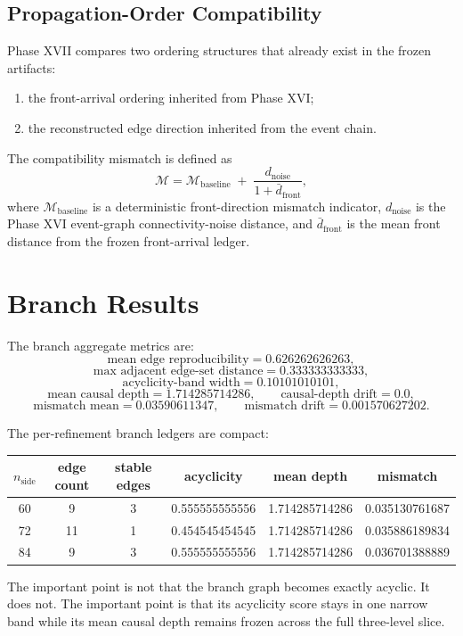 \documentclass[11pt]{article}
\begin{document}
\subsection{Propagation-Order Compatibility}

Phase XVII compares two ordering structures that already exist in the frozen artifacts:
\begin{enumerate}
\item the front-arrival ordering inherited from Phase XVI;
\item the reconstructed edge direction inherited from the event chain.
\end{enumerate}

The compatibility mismatch is defined as
\[
\mathcal{M}
=
\mathcal{M}_{\mathrm{baseline}}
\;+\;
\frac{d_{\mathrm{noise}}}{1+\bar d_{\mathrm{front}}},
\]
where $\mathcal{M}_{\mathrm{baseline}}$ is a deterministic front-direction mismatch indicator, $d_{\mathrm{noise}}$ is the Phase XVI event-graph connectivity-noise distance, and $\bar d_{\mathrm{front}}$ is the mean front distance from the frozen front-arrival ledger.

\section{Branch Results}

The branch aggregate metrics are:
\[
\text{mean edge reproducibility}=0.626262626263,
\]
\[
\text{max adjacent edge-set distance}=0.333333333333,
\]
\[
\text{acyclicity-band width}=0.10101010101,
\]
\[
\text{mean causal depth}=1.714285714286,
\qquad
\text{causal-depth drift}=0.0,
\]
\[
\text{mismatch mean}=0.03590611347,
\qquad
\text{mismatch drift}=0.001570627202.
\]

The per-refinement branch ledgers are compact:
\begin{center}
\begin{tabular}{cccccc}
\toprule
$n_{\mathrm{side}}$ & edge count & stable edges & acyclicity & mean depth & mismatch \\
\midrule
60 & 9  & 3 & 0.555555555556 & 1.714285714286 & 0.035130761687 \\
72 & 11 & 1 & 0.454545454545 & 1.714285714286 & 0.035886189834 \\
84 & 9  & 3 & 0.555555555556 & 1.714285714286 & 0.036701388889 \\
\bottomrule
\end{tabular}
\end{center}

The important point is not that the branch graph becomes exactly acyclic. It does not. The important point is that its acyclicity score stays in one narrow band while its mean causal depth remains frozen across the full three-level slice.
\end{document}
